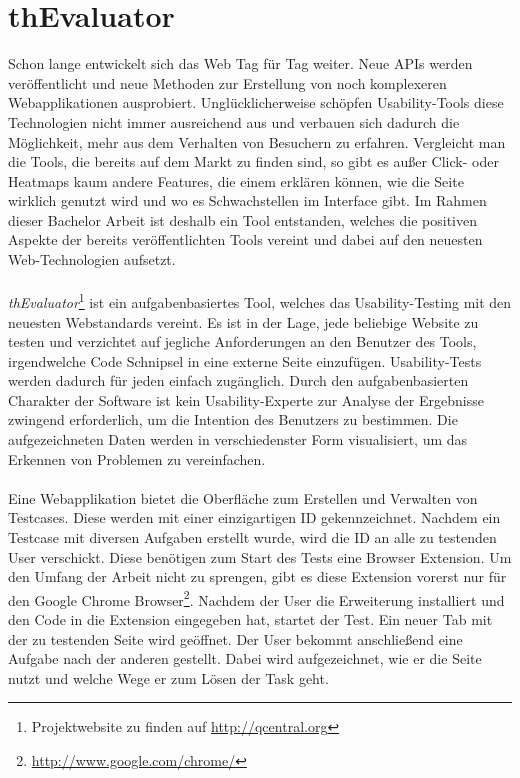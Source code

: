 %
%
%
%

\chapter{thEvaluator}

Schon lange entwickelt sich das Web Tag für Tag weiter. Neue APIs werden veröffentlicht und neue Methoden zur Erstellung von noch komplexeren Webapplikationen ausprobiert. Unglücklicherweise schöpfen Usability-Tools diese Technologien nicht immer ausreichend aus und verbauen sich dadurch die Möglichkeit, mehr aus dem Verhalten von Besuchern zu erfahren. Vergleicht man die Tools, die bereits auf dem Markt zu finden sind, so gibt es außer Click- oder Heatmaps kaum andere Features, die einem erklären können, wie die Seite wirklich genutzt wird und wo es Schwachstellen im Interface gibt. Im Rahmen dieser Bachelor Arbeit ist deshalb ein Tool entstanden, welches die positiven Aspekte der bereits veröffentlichten Tools vereint und dabei auf den neuesten Web-Technologien aufsetzt.\\
\\
\textit{thEvaluator}\footnote{Projektwebsite zu finden auf \url{http://qcentral.org}} ist ein aufgabenbasiertes Tool, welches das Usability-Testing mit den neuesten Webstandards vereint. Es ist in der Lage, jede beliebige Website zu testen und verzichtet auf jegliche Anforderungen an den Benutzer des Tools, irgendwelche Code Schnipsel in eine externe Seite einzufügen. Usability-Tests werden dadurch für jeden einfach zugänglich. Durch den aufgabenbasierten Charakter der Software ist kein Usability-Experte zur Analyse der Ergebnisse zwingend erforderlich, um die Intention des Benutzers zu bestimmen. Die aufgezeichneten Daten werden in verschiedenster Form visualisiert, um das Erkennen von Problemen zu vereinfachen.\\
\\
Eine Webapplikation bietet die Oberfläche zum Erstellen und Verwalten von Testcases. Diese werden mit einer einzigartigen ID gekennzeichnet. Nachdem ein Testcase mit diversen Aufgaben erstellt wurde, wird die ID an alle zu testenden User verschickt. Diese benötigen zum Start des Tests eine Browser Extension. Um den Umfang der Arbeit nicht zu sprengen, gibt es diese Extension vorerst nur für den Google Chrome Browser\footnote{\url{http://www.google.com/chrome/}}. Nachdem der User die Erweiterung installiert und den Code in die Extension eingegeben hat, startet der Test. Ein neuer Tab mit der zu testenden Seite wird geöffnet. Der User bekommt anschließend eine Aufgabe nach der anderen gestellt. Dabei wird aufgezeichnet, wie er die Seite nutzt und welche Wege er zum Lösen der Task geht.







